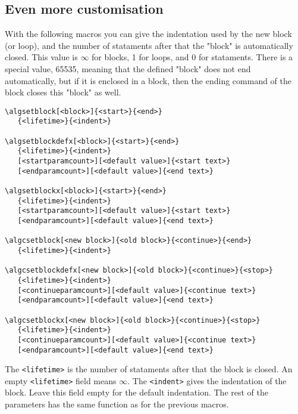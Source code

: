 \documentclass{article}
\begin{document}
\begin{minipage}[b]{0.5\linewidth}
\begin{minipage}[b]{0.5\linewidth}
\begin{minipage}[b]{0.5\linewidth}
\begin{minipage}[b]{0.5\linewidth}
\begin{minipage}[b]{0.5\linewidth}
\begin{minipage}[b]{0.5\linewidth}
\begin{minipage}[b]{0.5\linewidth}
\subsection{Even more customisation}\label{setblock}

With the following macros you can give the indentation used by the new block (or loop),
and the number of stataments after that the "block" is automatically closed. This value is $\infty$
for blocks, 1 for loops, and 0 for stataments. There is a special value, 65535, meaning that the
defined "block" does not end automatically, but if it is enclosed in a block, then the ending
command of the block closes this "block" as well.

\begin{verbatim}
\algsetblock[<block>]{<start>}{<end>}
   {<lifetime>}{<indent>}

\algsetblockdefx[<block>]{<start>}{<end>}
   {<lifetime>}{<indent>}
   [<startparamcount>][<default value>]{<start text>}
   [<endparamcount>][<default value>]{<end text>}

\algsetblockx[<block>]{<start>}{<end>}
   {<lifetime>}{<indent>}
   [<startparamcount>][<default value>]{<start text>}
   [<endparamcount>][<default value>]{<end text>}

\algcsetblock[<new block>]{<old block>}{<continue>}{<end>}
   {<lifetime>}{<indent>}

\algcsetblockdefx[<new block>]{<old block>}{<continue>}{<stop>}
   {<lifetime>}{<indent>}
   [<continueparamcount>][<default value>]{<continue text>}
   [<endparamcount>][<default value>]{<end text>}

\algcsetblockx[<new block>]{<old block>}{<continue>}{<stop>}
   {<lifetime>}{<indent>}
   [<continueparamcount>][<default value>]{<continue text>}
   [<endparamcount>][<default value>]{<end text>}
\end{verbatim}

The \verb:<lifetime>: is the number of stataments after that the block is closed. An empty
\verb:<lifetime>: field means $\infty$. The \verb:<indent>: gives the indentation of the block.
Leave this field empty for the default indentation. The rest of the parameters has the same
function as for the previous macros.


\end{minipage}
\end{minipage}
\end{minipage}
\end{minipage}
\end{minipage}
\end{minipage}
\end{minipage}
\end{document}
